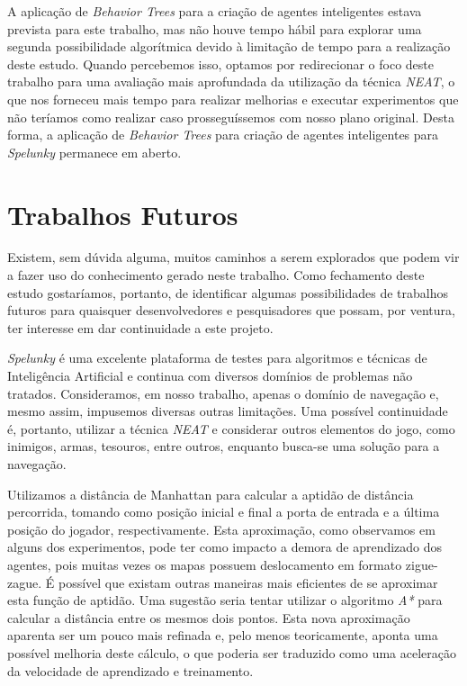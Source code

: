 A aplicação de \textit{Behavior Trees} para a criação de agentes inteligentes
estava prevista para este trabalho, mas não houve tempo hábil para explorar uma
segunda possibilidade algorítmica devido à limitação de tempo para a realização
deste estudo. Quando percebemos isso, optamos por redirecionar o foco deste
trabalho para uma avaliação mais aprofundada da utilização da técnica
\textit{NEAT}, o que nos forneceu mais tempo para realizar melhorias e executar
experimentos que não teríamos como realizar caso prosseguíssemos com nosso plano
original. Desta forma, a aplicação de \textit{Behavior Trees} para criação de
agentes inteligentes para \textit{Spelunky} permanece em aberto.


\section{Trabalhos Futuros}
Existem, sem dúvida alguma, muitos caminhos a serem explorados que podem vir a
fazer uso do conhecimento gerado neste trabalho. Como fechamento deste estudo
gostaríamos, portanto, de identificar algumas possibilidades de trabalhos
futuros para quaisquer desenvolvedores e pesquisadores que possam, por ventura,
ter interesse em dar continuidade a este projeto.

\textit{Spelunky} é uma excelente plataforma de testes para algoritmos e
técnicas de Inteligência Artificial e continua com diversos domínios de
problemas não tratados. Consideramos, em nosso trabalho, apenas o domínio de
navegação e, mesmo assim, impusemos diversas outras limitações. Uma possível
continuidade é, portanto, utilizar a técnica \textit{NEAT} e considerar outros
elementos do jogo, como inimigos, armas, tesouros, entre outros, enquanto
busca-se uma solução para a navegação.

Utilizamos a distância de Manhattan para calcular a aptidão de distância
percorrida, tomando como posição inicial e final a porta de entrada e a última
posição do jogador, respectivamente. Esta aproximação, como observamos em alguns
dos experimentos, pode ter como impacto a demora de aprendizado dos agentes,
pois muitas vezes os mapas possuem deslocamento em formato zigue-zague. É
possível que existam outras maneiras mais eficientes de se aproximar esta função
de aptidão. Uma sugestão seria tentar utilizar o algoritmo \textit{A*} para
calcular a distância entre os mesmos dois pontos. Esta nova aproximação aparenta
ser um pouco mais refinada e, pelo menos teoricamente, aponta uma possível
melhoria deste cálculo, o que poderia ser traduzido como uma aceleração da
velocidade de aprendizado e treinamento.

